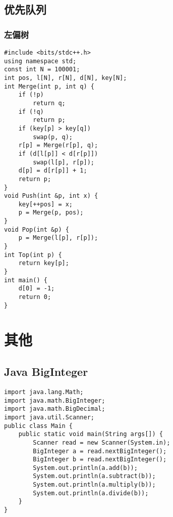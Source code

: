 ﻿\documentclass[a4paper]{article}
\begin{document}
\subsection{优先队列}
\subsubsection{左偏树}
\begin{lstlisting}
#include <bits/stdc++.h>
using namespace std;
const int N = 100001;
int pos, l[N], r[N], d[N], key[N];
int Merge(int p, int q) {
    if (!p)
        return q;
    if (!q)
        return p;
    if (key[p] > key[q])
        swap(p, q);
    r[p] = Merge(r[p], q);
    if (d[l[p]] < d[r[p]])
        swap(l[p], r[p]);
    d[p] = d[r[p]] + 1;
    return p;
}
void Push(int &p, int x) {
    key[++pos] = x;
    p = Merge(p, pos);
}
void Pop(int &p) {
    p = Merge(l[p], r[p]);
}
int Top(int p) {
    return key[p];
}
int main() {
    d[0] = -1;
    return 0;
}
\end{lstlisting}
\section{其他}
\subsection{Java BigInteger}
\begin{lstlisting}
import java.lang.Math;
import java.math.BigInteger;
import java.math.BigDecimal;
import java.util.Scanner;
public class Main {
    public static void main(String args[]) {
        Scanner read = new Scanner(System.in);
        BigInteger a = read.nextBigInteger();
        BigInteger b = read.nextBigInteger();
        System.out.println(a.add(b));
        System.out.println(a.subtract(b));
        System.out.println(a.multiply(b));
        System.out.println(a.divide(b));
    }
}
\end{lstlisting}
\end{document}
